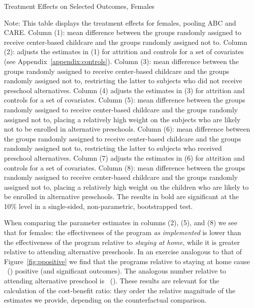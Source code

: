 \begin{table}[H] 
\begin{threeparttable}
\caption{Treatment Effects on Selected Outcomes, Females}
\label{table:females}
\centering
\scalebox{.97}{
}
\begin{tablenotes}
\footnotesize
\item Note: This table displays the treatment effects for females, pooling ABC and CARE. Column (1): mean difference between the groups randomly assigned to receive center-based childcare and the groups randomly assigned not to. Column (2): adjusts the estimates in (1) for attrition and controls for a set of covariates (see Appendix~\ref{appendix:controls}). Column (3): mean difference between the groups randomly assigned to receive center-based childcare and the groups randomly assigned not to, restricting the latter to subjects who did not receive preschool alternatives. Column (4) adjusts the estimates in (3) for attrition and controls for a set of covariates. Column (5): mean difference between the groups randomly assigned to receive center-based childcare and the groups randomly assigned not to, placing a relatively high weight on the subjects who are likely not to be enrolled in alternative preschools. Column (6): mean difference between the groups randomly assigned to receive center-based childcare and the groups randomly assigned not to, restricting the latter to subjects who received preschool alternatives. Column (7) adjusts the estimates in (6) for attrition and controls for a set of covariates. Column (8): mean difference between the groups randomly assigned to receive center-based childcare and the groups randomly assigned not to, placing a relatively high weight on the children who are likely to be enrolled in alternative preschools. The results in bold are significant at the 10\% level in a single-sided, non-parametric, bootstrapped test.
\end{tablenotes}
\end{threeparttable}
\end{table}

\noindent When comparing the parameter estimates in columns (2), (5), and (8) we see that for females: the effectiveness of the program \textit{as implemented} is lower than the effectiveness of the program relative to \textit{staying at home}, while it is greater relative to attending alternative preschools. In an exercise analogous to that of Figure~\ref{fig:ppositive} we find that the programs relative to staying at home cause \positivecsnf\ (\positivescsnf) positive (and significant outcomes). The analogous number relative to attending alternative preschool is \positivecsaf\ (\positivescsaf). These results are relevant for the calculation of the cost-benefit ratio: they order the relative magnitude of the estimates we provide, depending on the counterfactual comparison.\\ 

